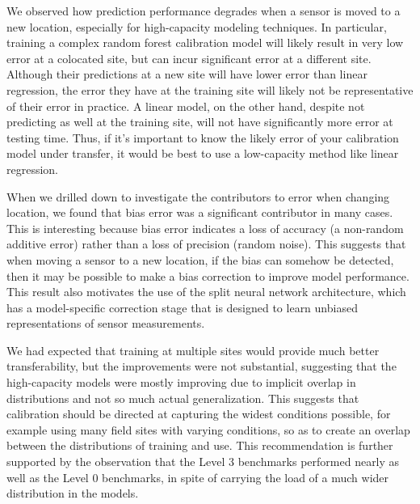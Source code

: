 \documentclass[journal abbreviation, manuscript]{copernicus}
\begin{document}
We observed how prediction performance degrades when a sensor is moved to a new location, especially for high-capacity modeling techniques. In particular, training a complex random forest calibration model will likely result in very low error at a colocated site, but can incur significant error at a different site. Although their predictions at a new site will have lower error than linear regression, the error they have at the training site will likely not be representative of their error in practice.  A linear model, on the other hand, despite not predicting as well at the training site, will not have significantly more error at testing time.  Thus, if it's important to know the likely error of your calibration model under transfer, it would be best to use a low-capacity method like linear regression.

When we drilled down to investigate the contributors to error when changing location, we found that bias error was a significant contributor in many cases. This is interesting because bias error indicates a loss of accuracy (a non-random additive error) rather than a loss of precision (random noise). This suggests that when moving a sensor to a new location, if the bias can somehow be detected, then it may be possible to make a bias correction to improve model performance. This result also motivates the use of the split neural network architecture, which has a model-specific correction stage that is designed to learn unbiased representations of sensor measurements.

We had expected that training at multiple sites would provide much better transferability, but the improvements were not substantial, suggesting that the high-capacity models were mostly improving due to implicit overlap in distributions and not so much actual generalization.  This suggests that calibration should be directed at capturing the widest conditions possible, for example using many field sites with varying conditions, so as to create an overlap between the distributions of training and use.  This recommendation is further supported by the observation that the Level 3 benchmarks performed nearly as well as the Level 0 benchmarks, in spite of carrying the load of a much wider distribution in the models.
\end{document}
